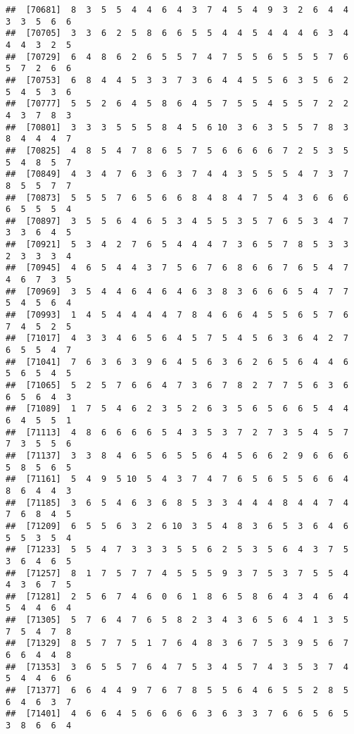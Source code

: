 \documentclass[
]{book}
\begin{document}
\begin{verbatim}
##  [70681]  8  3  5  5  4  4  6  4  3  7  4  5  4  9  3  2  6  4  4  3  3  5  6  6
##  [70705]  3  3  6  2  5  8  6  6  5  5  4  4  5  4  4  4  6  3  4  4  4  3  2  5
##  [70729]  6  4  8  6  2  6  5  5  7  4  7  5  5  6  5  5  5  7  6  5  7  2  6  6
##  [70753]  6  8  4  4  5  3  3  7  3  6  4  4  5  5  6  3  5  6  2  5  4  5  3  6
##  [70777]  5  5  2  6  4  5  8  6  4  5  7  5  5  4  5  5  7  2  2  4  3  7  8  3
##  [70801]  3  3  3  5  5  5  8  4  5  6 10  3  6  3  5  5  7  8  3  8  4  4  4  7
##  [70825]  4  8  5  4  7  8  6  5  7  5  6  6  6  6  7  2  5  3  5  5  4  8  5  7
##  [70849]  4  3  4  7  6  3  6  3  7  4  4  3  5  5  5  4  7  3  7  8  5  5  7  7
##  [70873]  5  5  5  7  6  5  6  6  8  4  8  4  7  5  4  3  6  6  6  6  5  5  5  4
##  [70897]  3  5  5  6  4  6  5  3  4  5  5  3  5  7  6  5  3  4  7  3  3  6  4  5
##  [70921]  5  3  4  2  7  6  5  4  4  4  7  3  6  5  7  8  5  3  3  2  3  3  3  4
##  [70945]  4  6  5  4  4  3  7  5  6  7  6  8  6  6  7  6  5  4  7  4  6  7  3  5
##  [70969]  3  5  4  4  6  4  6  4  6  3  8  3  6  6  6  5  4  7  7  5  4  5  6  4
##  [70993]  1  4  5  4  4  4  4  7  8  4  6  6  4  5  5  6  5  7  6  7  4  5  2  5
##  [71017]  4  3  3  4  6  5  6  4  5  7  5  4  5  6  3  6  4  2  7  6  5  5  4  7
##  [71041]  7  6  3  6  3  9  6  4  5  6  3  6  2  6  5  6  4  4  6  5  6  5  4  5
##  [71065]  5  2  5  7  6  6  4  7  3  6  7  8  2  7  7  5  6  3  6  6  5  6  4  3
##  [71089]  1  7  5  4  6  2  3  5  2  6  3  5  6  5  6  6  5  4  4  6  4  5  5  1
##  [71113]  4  8  6  6  6  6  5  4  3  5  3  7  2  7  3  5  4  5  7  7  3  5  5  6
##  [71137]  3  3  8  4  6  5  6  5  5  6  4  5  6  6  2  9  6  6  6  5  8  5  6  5
##  [71161]  5  4  9  5 10  5  4  3  7  4  7  6  5  6  5  5  6  6  4  8  6  4  4  3
##  [71185]  3  6  5  4  6  3  6  8  5  3  3  4  4  4  8  4  4  7  4  7  6  8  4  5
##  [71209]  6  5  5  6  3  2  6 10  3  5  4  8  3  6  5  3  6  4  6  5  5  3  5  4
##  [71233]  5  5  4  7  3  3  3  5  5  6  2  5  3  5  6  4  3  7  5  3  6  4  6  5
##  [71257]  8  1  7  5  7  7  4  5  5  5  9  3  7  5  3  7  5  5  4  4  3  6  7  5
##  [71281]  2  5  6  7  4  6  0  6  1  8  6  5  8  6  4  3  4  6  4  5  4  4  6  4
##  [71305]  5  7  6  4  7  6  5  8  2  3  4  3  6  5  6  4  1  3  5  7  5  4  7  8
##  [71329]  8  5  7  7  5  1  7  6  4  8  3  6  7  5  3  9  5  6  7  6  6  4  4  8
##  [71353]  3  6  5  5  7  6  4  7  5  3  4  5  7  4  3  5  3  7  4  5  4  4  6  6
##  [71377]  6  6  4  4  9  7  6  7  8  5  5  6  4  6  5  5  2  8  5  6  4  6  3  7
##  [71401]  4  6  6  4  5  6  6  6  6  3  6  3  3  7  6  6  5  6  5  3  8  6  6  4

\end{verbatim}
\end{document}

